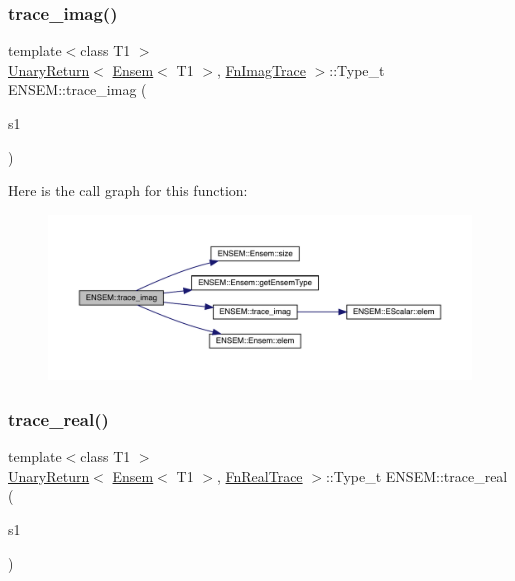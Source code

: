 \subsubsection{\texorpdfstring{trace\_imag()}{trace\_imag()}}
{\footnotesize\ttfamily template$<$class T1 $>$ \\
\mbox{\hyperlink{structENSEM_1_1UnaryReturn}{Unary\+Return}}$<$ \mbox{\hyperlink{classENSEM_1_1Ensem}{Ensem}}$<$ T1 $>$, \mbox{\hyperlink{structENSEM_1_1FnImagTrace}{Fn\+Imag\+Trace}} $>$\+::Type\+\_\+t E\+N\+S\+E\+M\+::trace\+\_\+imag (\begin{DoxyParamCaption}\item[{const \mbox{\hyperlink{classENSEM_1_1Ensem}{Ensem}}$<$ T1 $>$ \&}]{s1 }\end{DoxyParamCaption})\hspace{0.3cm}{\ttfamily [inline]}}

Here is the call graph for this function\+:\nopagebreak
\begin{figure}[H]
\begin{center}
\leavevmode
\includegraphics[width=350pt]{d1/d9e/group__eensem_ga26802b2d0529b6b46a86cf2a04647476_cgraph}
\end{center}
\end{figure}
\mbox{\label{group__eensem_gad19d894f22555d78d30d2e186300fb11}} 
\subsubsection{\texorpdfstring{trace\_real()}{trace\_real()}}
{\footnotesize\ttfamily template$<$class T1 $>$ \\
\mbox{\hyperlink{structENSEM_1_1UnaryReturn}{Unary\+Return}}$<$ \mbox{\hyperlink{classENSEM_1_1Ensem}{Ensem}}$<$ T1 $>$, \mbox{\hyperlink{structENSEM_1_1FnRealTrace}{Fn\+Real\+Trace}} $>$\+::Type\+\_\+t E\+N\+S\+E\+M\+::trace\+\_\+real (\begin{DoxyParamCaption}\item[{const \mbox{\hyperlink{classENSEM_1_1Ensem}{Ensem}}$<$ T1 $>$ \&}]{s1 }\end{DoxyParamCaption})\hspace{0.3cm}{\ttfamily [inline]}}

